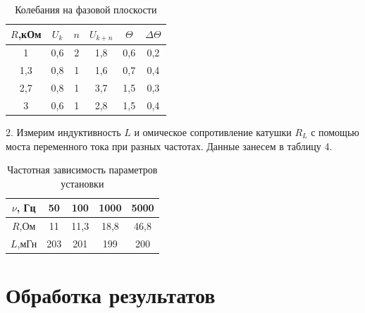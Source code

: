 \documentclass[a4paper,12pt]{article}
\begin{document}
\begin{table}[h!]
	\centering
	\caption{ Колебания на фазовой плоскости }
	
	\begin{tabular}{|c|c|c|c|c|c|}
		\hline 
		$R$,кОм & $U_k$ & $n$ & $U_{k+n}$ & $\Theta$ &  $\Delta \Theta$ \\ 
		\hline 
		1 & 0,6 & 2 & 1,8 & 0,6 & 0,2 \\ 
		\hline 
		1,3 & 0,8 & 1 & 1,6 & 0,7 & 0,4 \\ 
		\hline 
		2,7 & 0,8 & 1 & 3,7 & 1,5 & 0,3\\ 
		\hline 
		3 & 0,6 & 1 & 2,8 & 1,5 & 0,4\\ 
		\hline 
	\end{tabular} 
	
\end{table}

2. Измерим индуктивность $L$ и омическое сопротивление катушки $R_L$ с помощью моста переменного тока при разных частотах. Данные занесем в таблицу 4.

\begin{table} [h!]
	\centering
	\caption{ Частотная зависимость параметров установки }
	
	\begin{tabular}{|c|c|c|c|c|}
		\hline 
		$\nu$, Гц & 50 & 100 & 1000 & 5000 \\ 
		\hline 
		$R$,Ом & 11 & 11,3 & 18,8 & 46,8 \\ 
		\hline 
		$L$,мГн & 203 & 201 & 199 & 200 \\ 
		\hline 
	\end{tabular} 
	
\end{table}

\section{Обработка результатов}
\end{document}
